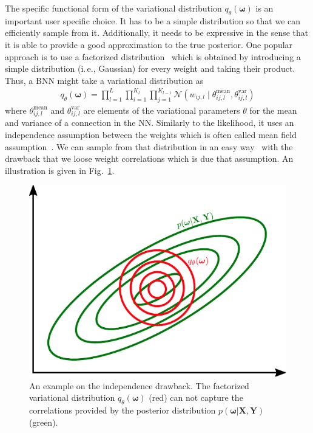 \documentclass[runningheads]{llncs}
\begin{document}
The specific functional form of the variational distribution $q_\theta(\boldsymbol{\omega})$ is an important user specific choice.
It has to be a simple distribution so that we can efficiently sample from it.
Additionally, it needs to be expressive in the sense that it is able to provide a good approximation to the true posterior.
One popular approach is to use a factorized distribution~\cite{BlundellBBB,Graves2011Practical,hernandez2015probabilistic} which is obtained by introducing a simple distribution (i.\,e., Gaussian) for every weight and taking their product.
Thus, a BNN might take a variational distribution as 
\begin{align}
    q_\theta\left(\boldsymbol{\omega}\right) = \prod_{l=1}^{L}\prod_{i=1}^{K_l}\prod_{j=1}^{K_{l-1}} \mathcal{N}\left( w_{ij,l} \mid \theta^\mathrm{mean}_{ij,l}, \theta^\mathrm{var}_{ij,l}\right)\label{eq:variational_factorized}
\end{align}
where $\theta^\mathrm{mean}_{ij,l}$ and $\theta^\mathrm{var}_{ij,l}$ are elements of the variational parameters $\theta$ for the mean and variance of a connection in the NN. 
Similarly to the likelihood, it uses an independence assumption between the weights which is often called mean field assumption~\cite{blei2017variational}.
We can sample from that distribution in an easy way~\cite{bishop:2006:PRML} with the drawback that we loose weight correlations which is due that assumption. An illustration is given in Fig.~\ref{fig:correlation_loss}.
\begin{figure}
    \centering
    \includegraphics[width=.6\textwidth]{images/loosing_correlations.pdf}
    \caption{An example on the independence drawback. The factorized variational distribution $q_\theta(\boldsymbol{\omega})$ (red) can not capture the correlations provided by the posterior distribution $p(\boldsymbol{\omega} | \mathbf{X}, \mathbf{Y})$ (green).}
    \label{fig:correlation_loss}
\end{figure}
\end{document}

